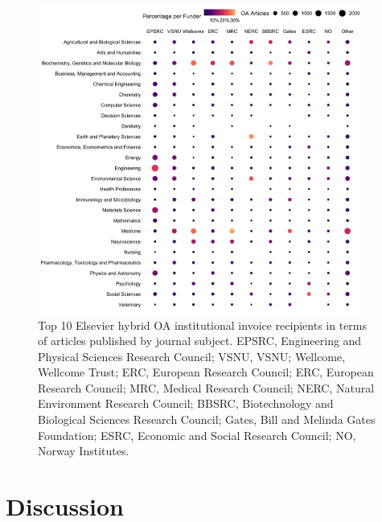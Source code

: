 \documentclass[a4paper,man,floatsintext,longtable,noextraspace,12pt]{apa6}
\begin{document}
\begin{figure}[H]

{\centering \includegraphics[width=0.95\textwidth]{../figure/funder_subject.png}

}

\caption{Top 10 Elsevier hybrid OA institutional invoice recipients in terms of articles published by journal subject. EPSRC, Engineering and Physical Sciences Research Council; VSNU, VSNU; Wellcome, Wellcome Trust; ERC, European Research Council; ERC, European Research Council; MRC, Medical Research Council; NERC, Natural Environment Research Council; BBSRC, Biotechnology and Biological Sciences Research Council; Gates, Bill and Melinda Gates Foundation; ESRC, Economic and Social Research Council; NO, Norway Institutes. }\label{fig:field_funder_matrix}
\end{figure}

\hypertarget{discussion}{%
\section{Discussion}\label{discussion}}
\end{document}
